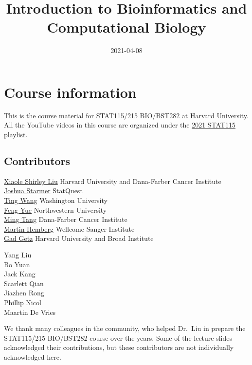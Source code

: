 \documentclass[
]{book}
\title{Introduction to Bioinformatics and Computational Biology}
\author{}
\date{\vspace{-2.5em}2021-04-08}
\begin{document}
\maketitle

{
\setcounter{tocdepth}{1}
\tableofcontents
}
\hypertarget{course-information}{%
\chapter{Course information}\label{course-information}}

This is the course material for STAT115/215 BIO/BST282 at Harvard University.\\
All the YouTube videos in this course are organized under the \href{https://www.youtube.com/playlist?list=PLeB-Dlq-v6taAXK6ZCGfqImrNWJzFt3p3}{2021 STAT115 playlist}.

\hypertarget{contributors}{%
\section{Contributors}\label{contributors}}

\href{http://http://liulab.dfci.harvard.edu/}{Xiaole Shirley Liu} Harvard University and Dana-Farber Cancer Institute\\
\href{https://statquest.org/}{Joshua Starmer} StatQuest\\
\href{http://wang.wustl.edu/}{Ting Wang} Washington University\\
\href{http://yuelab.org/}{Feng Yue} Northwestern University\\
\href{https://divingintogeneticsandgenomics.rbind.io/}{Ming Tang} Dana-Farber Cancer Institute\\
\href{https://www.sanger.ac.uk/group/hemberg-group/}{Martin Hemberg} Wellcome Sanger Institute\\
\href{https://www.broadinstitute.org/labs/getz}{Gad Getz} Harvard University and Broad Institute

Yang Liu\\
Bo Yuan\\
Jack Kang\\
Scarlett Qian\\
Jiazhen Rong\\
Phillip Nicol\\
Maartin De Vries

We thank many colleagues in the community, who helped Dr.~Liu in prepare the STAT115/215 BIO/BST282 course over the years. Some of the lecture slides acknowledged their contributions, but these contributors are not individually acknowledged here.
\end{document}
